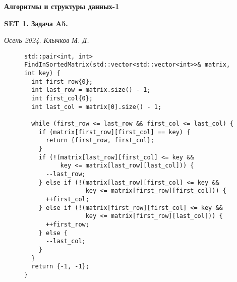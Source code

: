 \documentclass[11pt,a4paper]{scrarticle}
\author{Клычков Максим Дмитриевич}
\theoremstyle{definition}
\begin{document}
\centerline{\textbf{\huge Алгоритмы и структуры данных-1}}
\centerline{\textbf{SET 1. Задача A5.}}
\begin{flushright}
	\emph{Осень 2024. Клычков М. Д.}
\end{flushright}

\begin{figure}[htp]
	\centering
	\begin{verbatim}
std::pair<int, int> FindInSortedMatrix(std::vector<std::vector<int>>& matrix, int key) {
  int first_row{0};
  int last_row = matrix.size() - 1;
  int first_col{0};
  int last_col = matrix[0].size() - 1;

  while (first_row <= last_row && first_col <= last_col) {
    if (matrix[first_row][first_col] == key) {
      return {first_row, first_col};
    }
    if (!(matrix[last_row][first_col] <= key && 
          key <= matrix[last_row][last_col])) {
      --last_row;
    } else if (!(matrix[last_row][first_col] <= key && 
                 key <= matrix[first_row][first_col])) {
      ++first_col;
    } else if (!(matrix[first_row][first_col] <= key && 
                 key <= matrix[first_row][last_col])) {
      ++first_row;
    } else {
      --last_col;
    }
  }
  return {-1, -1};
}
	\end{verbatim}
\end{figure}
\end{document}
